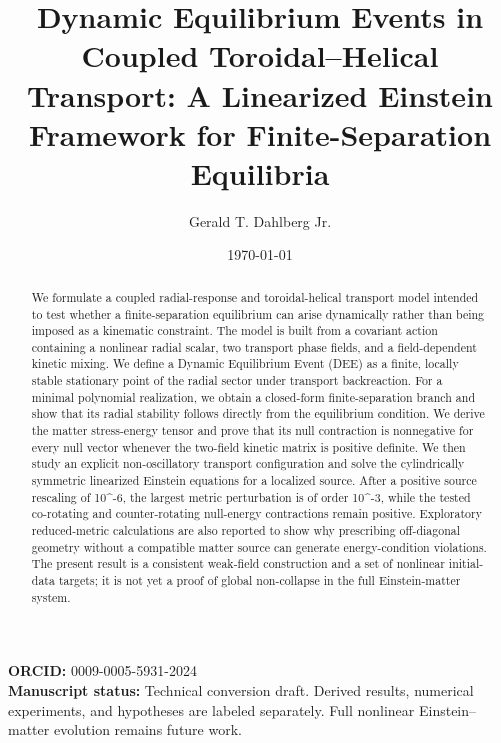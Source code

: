 \documentclass[aps,prd,preprint,nofootinbib,superscriptaddress]{revtex4-2}
\begin{document}
\title{Dynamic Equilibrium Events in Coupled Toroidal--Helical Transport: A Linearized Einstein Framework for Finite-Separation Equilibria}
\author{Gerald T. Dahlberg Jr.}
\date{\today}
\begin{abstract}


We formulate a coupled radial-response and toroidal-helical transport model intended to test whether a finite-separation equilibrium can arise dynamically rather than being imposed as a kinematic constraint. The model is built from a covariant action containing a nonlinear radial scalar, two transport phase fields, and a field-dependent kinetic mixing. We define a Dynamic Equilibrium Event (DEE) as a finite, locally stable stationary point of the radial sector under transport backreaction. For a minimal polynomial realization, we obtain a closed-form finite-separation branch and show that its radial stability follows directly from the equilibrium condition. We derive the matter stress-energy tensor and prove that its null contraction is nonnegative for every null vector whenever the two-field kinetic matrix is positive definite. We then study an explicit non-oscillatory transport configuration and solve the cylindrically symmetric linearized Einstein equations for a localized source. After a positive source rescaling of 10\textasciicircum{}-6, the largest metric perturbation is of order 10\textasciicircum{}-3, while the tested co-rotating and counter-rotating null-energy contractions remain positive. Exploratory reduced-metric calculations are also reported to show why prescribing off-diagonal geometry without a compatible matter source can generate energy-condition violations. The present result is a consistent weak-field construction and a set of nonlinear initial-data targets; it is not yet a proof of global non-collapse in the full Einstein-matter system.

\end{abstract}
\maketitle
\noindent\textbf{ORCID:} 0009-0005-5931-2024\\
\textbf{Manuscript status:} Technical conversion draft. Derived results, numerical experiments, and hypotheses are labeled separately. Full nonlinear Einstein--matter evolution remains future work.
\end{document}
